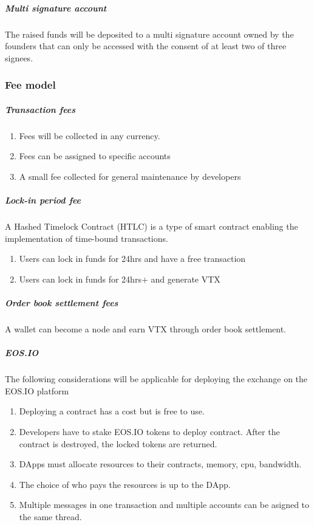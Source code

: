 \documentclass[]{article}
\begin{document}
\subparagraph{Multi signature account}
The raised funds will be deposited to a multi signature account owned by the founders 
that can only be accessed with the consent of at least two of three signees.

\subsubsection{Fee model}
\subparagraph{Transaction fees\\}
\begin{enumerate}
	\item Fees will be collected in any currency.\\
	\item Fees can be assigned to specific accounts\\
	\item A small fee collected for general maintenance by developers\\
\end{enumerate}
\subparagraph{Lock-in period fee\\}
	A Hashed Timelock Contract (HTLC)\cite{22} is a type of smart contract enabling the implementation of time-bound transactions.
\begin{enumerate}
	\item Users can lock in funds for 24hrs and have a free transaction\\
	\item Users can lock in funds for 24hrs+ and generate VTX \\
\end{enumerate}
\subparagraph{Order book settlement fees}
A wallet can become a node and earn VTX through order book settlement. 


\subparagraph{EOS.IO}
The following considerations will be applicable for deploying the exchange on the EOS.IO platform
\begin{enumerate}
\item Deploying a contract has a cost but is free to use. 
\item Developers have to stake EOS.IO tokens to deploy contract.
After the contract is destroyed, the locked tokens are returned.
\item DApps must allocate resources to their contracts, memory, cpu, bandwidth. 
\item The choice of who pays the resources is up to the DApp.
\item Multiple messages in one transaction and multiple accounts can be asigned to the same thread.

\end{enumerate}
\end{document}
